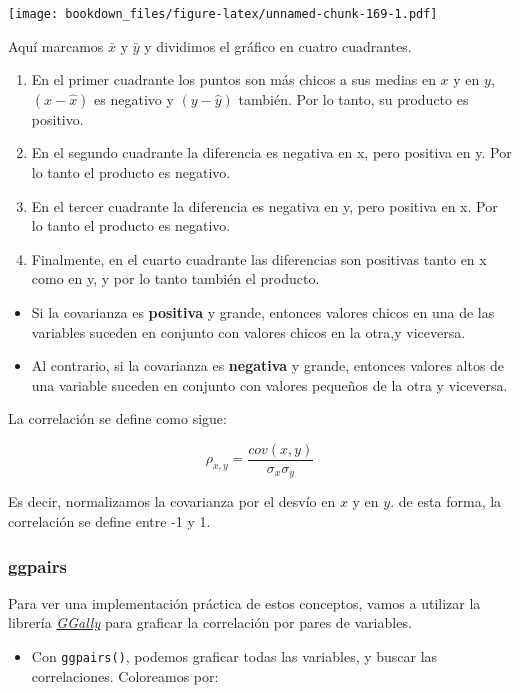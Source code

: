 \documentclass[]{book}
\providecommand{\tightlist}{%
  \setlength{\itemsep}{0pt}\setlength{\parskip}{0pt}}
\begin{document}
\texttt{[image: bookdown\_files/figure-latex/unnamed-chunk-169-1.pdf]}

Aquí marcamos \(\bar x\) y \(\bar y\) y dividimos el gráfico en cuatro cuadrantes.

\begin{enumerate}
\def\labelenumi{\arabic{enumi}.}
\tightlist
\item
  En el primer cuadrante los puntos son más chicos a sus medias en \(x\) y en \(y\), \((x-\hat x)\) es negativo y \((y-\hat y)\) también. Por lo tanto, su producto es positivo.
\item
  En el segundo cuadrante la diferencia es negativa en x, pero positiva en y. Por lo tanto el producto es negativo.
\item
  En el tercer cuadrante la diferencia es negativa en y, pero positiva en x. Por lo tanto el producto es negativo.
\item
  Finalmente, en el cuarto cuadrante las diferencias son positivas tanto en x como en y, y por lo tanto también el producto.
\end{enumerate}

\begin{itemize}
\tightlist
\item
  Si la covarianza es \textbf{positiva} y grande, entonces valores chicos en una de las variables suceden en conjunto con valores chicos en la otra,y viceversa.
\item
  Al contrario, si la covarianza es \textbf{negativa} y grande, entonces valores altos de una variable suceden en conjunto con valores pequeños de la otra y viceversa.
\end{itemize}

La correlación se define como sigue:

\[\rho_{x,y}=\frac{cov(x,y)}{\sigma_x \sigma_y}\]

Es decir, normalizamos la covarianza por el desvío en \(x\) y en \(y\). de esta forma, la correlación se define entre -1 y 1.

\hypertarget{ggpairs}{%
\subsubsection{ggpairs}\label{ggpairs}}

Para ver una implementación práctica de estos conceptos, vamos a utilizar la librería \href{https://ggobi.github.io/ggally/}{\emph{GGally}} para graficar la correlación por pares de variables.

\begin{itemize}
\tightlist
\item
  Con \texttt{ggpairs()}, podemos graficar todas las variables, y buscar las correlaciones. Coloreamos por:
\end{itemize}
\end{document}
